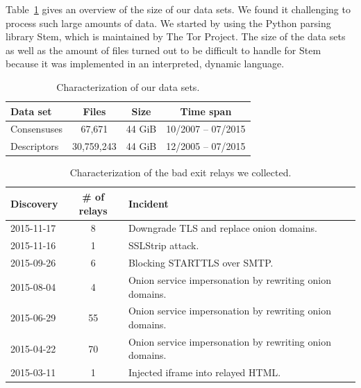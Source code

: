 Table~\ref{tab:collector-dataset} gives an overview of the size of our data
sets.  We found it challenging to process such large amounts of data.  We
started by using the Python parsing library Stem, which is maintained by The Tor
Project.  The size of the data sets as well as the amount of files turned out to
be difficult to handle for Stem because it was implemented in an interpreted,
dynamic language.

\begin{table}[t]
\centering
\begin{tabular}{l c c c}
\textbf{Data set} & \textbf{Files} & \textbf{Size} & \textbf{Time span} \\
\hline
Consensuses & 67,671 & 44 GiB & 10/2007 -- 07/2015 \\
Descriptors & 30,759,243 & 44 GiB & 12/2005 -- 07/2015 \\
\end{tabular}
\caption{Characterization of our data sets.}
\label{tab:collector-dataset}
\end{table}

\begin{table}[t]
\centering
\begin{tabular}{l c p{4cm}}
\textbf{Discovery} & \textbf{\# of relays} & \textbf{Incident} \\
\hline
2015-11-17 & 8 & Downgrade TLS and replace onion domains. \\
2015-11-16 & 1 & SSLStrip attack. \\
2015-09-26 & 6 & Blocking STARTTLS over SMTP. \\
2015-08-04 & 4 & Onion service impersonation by rewriting onion domains. \\
2015-06-29 & 55 & Onion service impersonation by rewriting onion domains. \\
2015-04-22 & 70 & Onion service impersonation by rewriting onion domains. \\
2015-03-11 & 1 & Injected iframe into relayed HTML. \\
\end{tabular}
\caption{Characterization of the bad exit relays we collected.}
\label{tab:exitmap-dataset}
\end{table}


